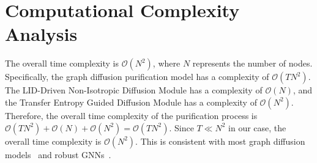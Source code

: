 \setcounter{equation}{0}
\setcounter{figure}{0}
\setcounter{table}{0}

\section{Computational Complexity Analysis}
\label{appendix:complexity}
The overall time complexity is $\mathcal{O}(N^{2})$, where $N$ represents the number of nodes. Specifically, the graph diffusion purification model has a complexity of $\mathcal{O}(T N^{2})$. The LID-Driven Non-Isotropic Diffusion Module has a complexity of $\mathcal{O}(N)$, and the Transfer Entropy Guided Diffusion Module has a complexity of  $\mathcal{O}(N^2)$. Therefore, the overall time complexity of the purification process is $\mathcal{O}(T N^{2}) + \mathcal{O}(N) + \mathcal{O}(N^2)=\mathcal{O}(T N^{2})$. Since $T\ll N^{2}$ in our case, the overall time complexity is $\mathcal{O}(N^2)$. This is consistent with most graph diffusion models~\cite{niu2020permutation, vignac2022digress, li2023graphmaker} and robust GNNs~\cite{zhao2023self, entezari2020all,jin2020graph}. 



